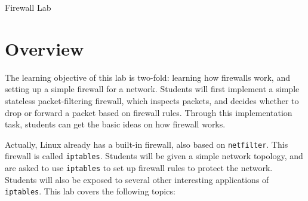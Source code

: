 
\newcommand{\commonfolder}{../../common-files}




\newcommand{\telnet} {\texttt{telnet}\xspace}
\newcommand{\iptables}{\texttt{iptables}\xspace}
\newcommand{\netfilter}{\texttt{netfilter}\xspace}
\newcommand{\Netfilter}{\texttt{Netfilter}\xspace}

\newcommand{\firewallFigs}{./Figs}

\newcommand{\pointleft}[1]{\reflectbox{\ding{217}} \textbf{\texttt{#1}}}





\begin{center}
{\LARGE Firewall Lab}
\end{center}




\section{Overview}

The learning objective of this lab is two-fold: learning
how firewalls work, and setting up a simple firewall
for a network. Students will first 
implement a simple stateless packet-filtering firewall, 
which inspects packets, and decides 
whether to drop or forward a packet based on firewall rules. 
Through this implementation task, students can get the 
basic ideas on how firewall works.


Actually, Linux already has a built-in firewall, also based on 
\texttt{netfilter}. This firewall is called \iptables. 
Students will be given a simple network topology, and are asked to
use \iptables to set up firewall rules to protect the network. 
Students will also be exposed to several other interesting 
applications of \iptables. 
This lab covers the following topics:


